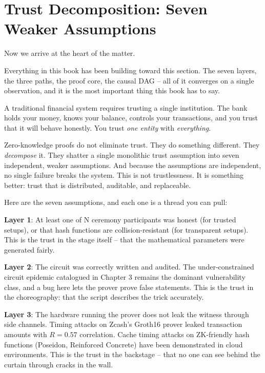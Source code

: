 \documentclass[
  11pt,
  openany]{report}
\renewcommand{\textbf}[1]{{\bfseries\color{MidnightBold}#1}}
\begin{document}
\section{Trust Decomposition: Seven Weaker
Assumptions}\label{trust-decomposition-seven-weaker-assumptions}

Now we arrive at the heart of the matter.

Everything in this book has been building toward this section. The seven layers,
the three paths, the proof core, the causal DAG -- all of it converges on a
single observation, and it is the most important thing this book has to say.

A traditional financial system requires trusting a single institution. The bank
holds your money, knows your balance, controls your transactions, and you trust
that it will behave honestly. You trust \emph{one entity} with
\emph{everything}.

Zero-knowledge proofs do not eliminate trust. They do something different. They
\emph{decompose} it. They shatter a single monolithic trust assumption into
seven independent, weaker assumptions. And because the assumptions are
independent, no single failure breaks the system. This is not trustlessness. It
is something better: trust that is distributed, auditable, and replaceable.

Here are the seven assumptions, and each one is a thread you can pull:

\textbf{Layer 1}: At least one of N ceremony participants was honest (for
trusted setups), or that hash functions are collision-resistant (for transparent
setups). This is the trust in the stage itself -- that the mathematical
parameters were generated fairly.

\textbf{Layer 2}: The circuit was correctly written and audited. The
under-constrained circuit epidemic catalogued in Chapter 3 remains the dominant
vulnerability class, and a bug here lets the prover prove false statements. This
is the trust in the choreography: that the script describes the trick
accurately.

\textbf{Layer 3}: The hardware running the prover does not leak the witness
through side channels. Timing attacks on Zcash's Groth16 prover leaked
transaction amounts with \(R = 0.57\) correlation. Cache timing attacks on
ZK-friendly hash functions (Poseidon, Reinforced Concrete) have been
demonstrated in cloud environments. This is the trust in the backstage -- that
no one can see behind the curtain through cracks in the wall.
\end{document}
